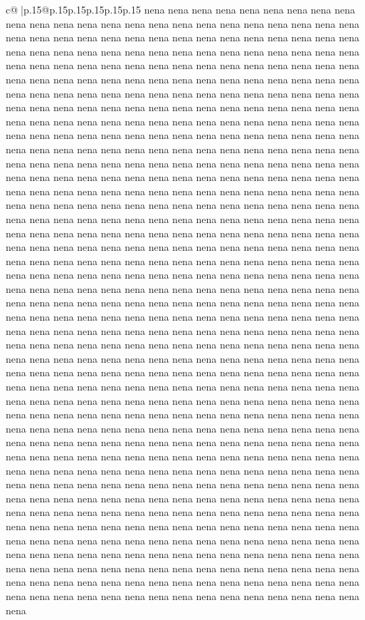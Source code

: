 \documentclass{article}
\begin{document}
{\begin{supertabular}{c@{$\;$}|p{.15\linewidth}@{}p{.15\linewidth}p{.15\linewidth}p{.15\linewidth}p{.15\linewidth}p{.15\linewidth}}
{{{nena nena nena nena nena nena nena nena nena nena nena nena nena nena nena nena nena nena nena nena nena nena nena nena nena nena nena nena nena nena nena nena nena nena nena nena nena nena nena nena nena nena nena nena nena nena nena nena nena nena nena nena nena nena nena nena nena nena nena nena nena nena nena nena nena nena nena nena nena nena nena nena nena nena nena nena nena nena nena nena nena nena nena nena nena nena nena nena nena nena nena nena nena nena nena nena nena nena nena nena nena nena nena nena nena nena nena nena nena nena nena nena nena nena nena nena nena nena nena nena nena nena nena nena nena nena nena nena nena nena nena nena nena nena nena nena nena nena nena nena nena nena nena nena nena nena nena nena nena nena nena nena nena nena nena nena nena nena nena nena nena nena nena nena nena nena nena nena nena nena nena nena nena nena nena nena nena nena nena nena nena nena nena nena nena nena nena nena nena nena nena nena nena nena nena nena nena nena nena nena nena nena nena nena nena nena nena nena nena nena nena nena nena nena nena nena nena nena nena nena nena nena nena nena nena nena nena nena nena nena nena nena nena nena nena nena nena nena nena nena nena nena nena nena nena nena nena nena nena nena nena nena nena nena nena nena nena nena nena nena nena nena nena nena nena nena nena nena nena nena nena nena nena nena nena nena nena nena nena nena nena nena nena nena nena nena nena nena nena nena nena nena nena nena nena nena nena nena nena nena nena nena nena nena nena nena nena nena nena nena nena nena nena nena nena nena nena nena nena nena nena nena nena nena nena nena nena nena nena nena nena nena nena nena nena nena nena nena nena nena nena nena nena nena nena nena nena nena nena nena nena nena nena nena nena nena nena nena nena nena nena nena nena nena nena nena nena nena nena nena nena nena nena nena nena nena nena nena nena nena nena nena nena nena nena nena nena nena nena nena nena nena nena nena nena nena nena nena nena nena nena nena nena nena nena nena nena nena nena nena nena nena nena nena nena nena nena nena nena nena nena nena nena nena nena nena nena nena nena nena nena nena nena nena nena nena nena nena nena nena nena nena nena nena nena nena nena nena nena nena nena nena nena nena nena nena nena nena nena nena nena nena nena nena nena nena nena nena nena nena nena nena nena nena nena nena nena nena nena nena nena nena nena nena nena nena nena nena nena nena nena nena nena nena nena nena nena nena nena nena nena nena nena nena nena nena nena nena nena nena nena nena nena nena nena nena nena nena nena nena nena nena nena nena nena nena nena nena nena nena nena nena nena nena nena nena nena nena nena nena nena nena nena nena nena nena nena nena nena nena nena nena nena nena nena nena nena nena nena nena nena nena nena nena nena nena nena nena nena nena nena nena nena nena nena nena nena nena nena nena nena nena nena nena nena nena nena nena nena nena nena nena nena nena nena nena nena nena nena nena nena nena nena nena nena nena nena nena nena nena nena nena nena nena nena nena nena nena nena nena nena nena nena nena nena nena nena nena nena nena nena nena nena nena nena nena nena nena nena nena }}}
\end{supertabular}}
\end{document}
